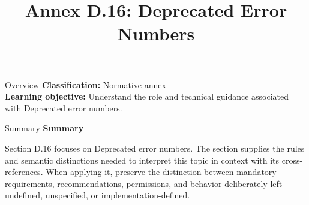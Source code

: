 \documentclass[10pt,letterpaper]{article}
\title{Annex D.16: Deprecated Error Numbers}
\author{}
\date{}
\begin{document}
\maketitle
\begin{CornellOverviewBox}{Overview}
\textbf{Classification:} Normative annex\\[2pt]
\textbf{Learning objective:} Understand the role and technical guidance associated with Deprecated error numbers.
\end{CornellOverviewBox}\begin{CornellSummaryBox}{Summary}
{\sffamily\bfseries\color{Accent} Summary}\par\vspace{3pt}Section D.16 focuses on Deprecated error numbers. The section supplies the rules and semantic distinctions needed to interpret this topic in context with its cross-references. When applying it, preserve the distinction between mandatory requirements, recommendations, permissions, and behavior deliberately left undefined, unspecified, or implementation-defined.
\end{CornellSummaryBox}
\end{document}

